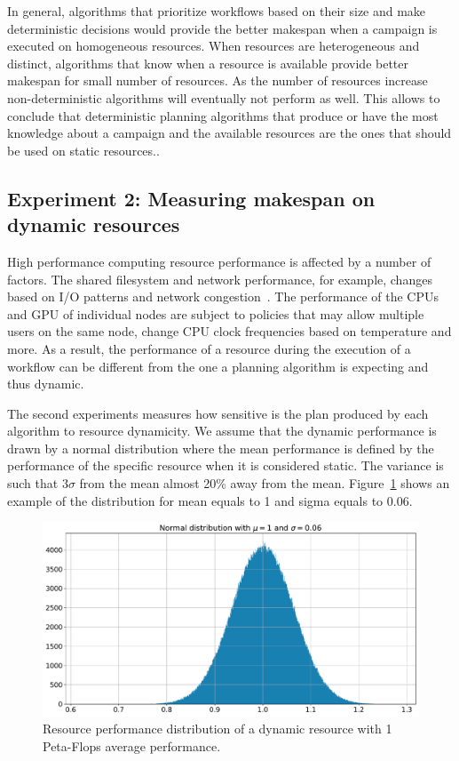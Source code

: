 In general, algorithms that prioritize workflows based on their size and make deterministic decisions would provide the better makespan when a campaign is executed on homogeneous resources.
When resources are heterogeneous and distinct, algorithms that know when a resource is available provide better makespan for small number of resources.
As the number of resources increase non-deterministic algorithms will eventually not perform as well.
This allows to conclude that deterministic planning algorithms that produce or have the most knowledge about a campaign and the available resources are the ones that should be used on static resources..


\subsection{Experiment 2: Measuring makespan on dynamic resources}

High performance computing resource performance is affected by a number of factors.
The shared filesystem and network performance, for example, changes based on I/O patterns and network congestion~\cite{brown2018interference}.
The performance of the CPUs and GPU of individual nodes are subject to policies that may allow multiple users on the same node, change CPU clock frequencies based on temperature and more.
As a result, the performance of a resource during the execution of a workflow can be different from the one a planning algorithm is expecting and thus dynamic.

The second experiments measures how sensitive is the plan produced by each algorithm to resource dynamicity.
We assume that the dynamic performance is drawn by a normal distribution where the mean performance is defined by the performance of the specific resource when it is considered static.
The variance is such that $3\sigma$ from the mean almost 20\% away from the mean.
Figure~\ref{fig:dynamic_res} shows an example of the distribution for mean equals to 1 and sigma equals to 0.06.

\begin{figure}[ht!]
    \centering
    \includegraphics[width=.95\textwidth]{figures/campaign/DynRes.pdf}
    \caption{Resource performance distribution of a dynamic resource with 1 Peta-Flops average performance.}
    \label{fig:dynamic_res}
\end{figure}

